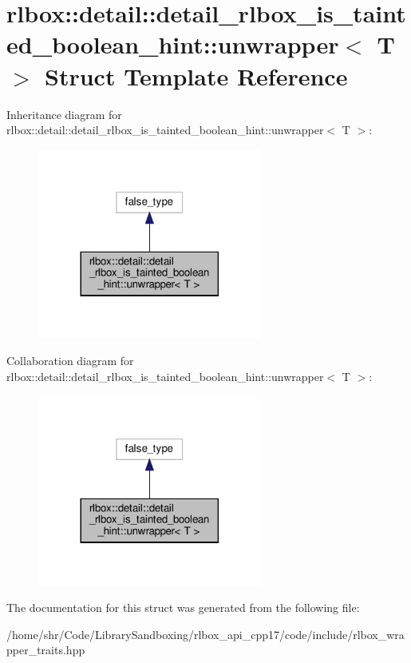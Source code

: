 \hypertarget{structrlbox_1_1detail_1_1detail__rlbox__is__tainted__boolean__hint_1_1unwrapper}{}\section{rlbox\+:\+:detail\+:\+:detail\+\_\+rlbox\+\_\+is\+\_\+tainted\+\_\+boolean\+\_\+hint\+:\+:unwrapper$<$ T $>$ Struct Template Reference}
\label{structrlbox_1_1detail_1_1detail__rlbox__is__tainted__boolean__hint_1_1unwrapper}


Inheritance diagram for rlbox\+:\+:detail\+:\+:detail\+\_\+rlbox\+\_\+is\+\_\+tainted\+\_\+boolean\+\_\+hint\+:\+:unwrapper$<$ T $>$\+:\nopagebreak
\begin{figure}[H]
\begin{center}
\leavevmode
\includegraphics[width=209pt]{structrlbox_1_1detail_1_1detail__rlbox__is__tainted__boolean__hint_1_1unwrapper__inherit__graph}
\end{center}
\end{figure}


Collaboration diagram for rlbox\+:\+:detail\+:\+:detail\+\_\+rlbox\+\_\+is\+\_\+tainted\+\_\+boolean\+\_\+hint\+:\+:unwrapper$<$ T $>$\+:\nopagebreak
\begin{figure}[H]
\begin{center}
\leavevmode
\includegraphics[width=209pt]{structrlbox_1_1detail_1_1detail__rlbox__is__tainted__boolean__hint_1_1unwrapper__coll__graph}
\end{center}
\end{figure}


The documentation for this struct was generated from the following file\+:\begin{DoxyCompactItemize}
\item 
/home/shr/\+Code/\+Library\+Sandboxing/rlbox\+\_\+api\+\_\+cpp17/code/include/rlbox\+\_\+wrapper\+\_\+traits.\+hpp\end{DoxyCompactItemize}

